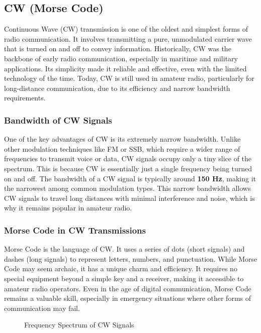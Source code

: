 \subsection{CW (Morse Code)}
\label{subsec:cw}

Continuous Wave (CW) transmission is one of the oldest and simplest forms of radio communication. It involves transmitting a pure, unmodulated carrier wave that is turned on and off to convey information. Historically, CW was the backbone of early radio communication, especially in maritime and military applications. Its simplicity made it reliable and effective, even with the limited technology of the time. Today, CW is still used in amateur radio, particularly for long-distance communication, due to its efficiency and narrow bandwidth requirements.

\subsubsection*{Bandwidth of CW Signals}
One of the key advantages of CW is its extremely narrow bandwidth. Unlike other modulation techniques like FM or SSB, which require a wider range of frequencies to transmit voice or data, CW signals occupy only a tiny slice of the spectrum. This is because CW is essentially just a single frequency being turned on and off. The bandwidth of a CW signal is typically around \textbf{150 Hz}, making it the narrowest among common modulation types. This narrow bandwidth allows CW signals to travel long distances with minimal interference and noise, which is why it remains popular in amateur radio.

\subsubsection*{Morse Code in CW Transmissions}
Morse Code is the language of CW. It uses a series of dots (short signals) and dashes (long signals) to represent letters, numbers, and punctuation. While Morse Code may seem archaic, it has a unique charm and efficiency. It requires no special equipment beyond a simple key and a receiver, making it accessible to amateur radio operators. Even in the age of digital communication, Morse Code remains a valuable skill, especially in emergency situations where other forms of communication may fail.

\begin{figure}[h]
    \centering
    \caption{Frequency Spectrum of CW Signals}
    \label{fig:cw-spectrum}
\end{figure}

